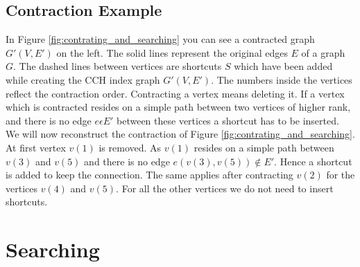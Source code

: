 \subsection{Contraction Example}

In Figure \ref{fig:contrating_and_searching} you can see a contracted graph $G'(V,E')$ on the left.
The solid lines represent the original edges $E$ of a graph $G$.
The dashed lines between vertices are shortcuts $S$ which have been added while creating the CCH index graph $G'(V, E')$.
The numbers inside the vertices reflect the contraction order.
Contracting a vertex means deleting it.
If a vertex which is contracted resides on a simple path between two vertices of higher rank, and there is no edge $e \epsilon E'$ between these vertices a shortcut has to be inserted.
We will now reconstruct the contraction of Figure \ref{fig:contrating_and_searching}.
At first vertex $v(1)$ is removed.
As $v(1)$ resides on a simple path between $v(3)$ and $v(5)$ and there is no edge $e(v(3), v(5)) \notin E'$. 
Hence a shortcut is added to keep the connection.
The same applies after contracting $v(2)$ for the vertices $v(4)$ and $v(5)$.
For all the other vertices we do not need to insert shortcuts.

\section{Searching}



